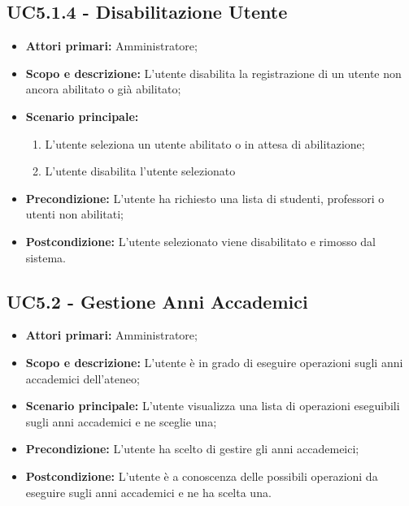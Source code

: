 \documentclass[AnalisiDeiRequisiti.tex]{subfiles}
\begin{document}
\subsection{UC5.1.4 - Disabilitazione Utente}
\begin{itemize}
	\item \textbf{Attori primari:} Amministratore;
	\item \textbf{Scopo e descrizione:} L'utente disabilita la registrazione di un utente non ancora abilitato o già abilitato;
	\item \textbf{Scenario principale:}
	\begin{enumerate}
		\item L'utente seleziona un utente abilitato o in attesa di abilitazione;
		\item L'utente disabilita l'utente selezionato
	\end{enumerate}
	\item \textbf{Precondizione:} L'utente ha richiesto una lista di studenti, professori o utenti non abilitati; 
	\item \textbf{Postcondizione:} L'utente selezionato viene disabilitato e rimosso dal sistema.
\end{itemize}
\subsection{UC5.2 - Gestione Anni Accademici}
\begin{itemize}
	\item \textbf{Attori primari:} Amministratore;
	\item \textbf{Scopo e descrizione:} L'utente è in grado di eseguire operazioni sugli anni accademici dell'ateneo;
	\item \textbf{Scenario principale:} L'utente visualizza una lista di operazioni eseguibili sugli anni accademici e ne sceglie una;
	\item \textbf{Precondizione:} L'utente ha scelto di gestire gli anni accademeici; 
	\item \textbf{Postcondizione:} L'utente è a conoscenza delle possibili operazioni da eseguire sugli anni accademici e ne ha scelta una.
\end{itemize}
\end{document}
